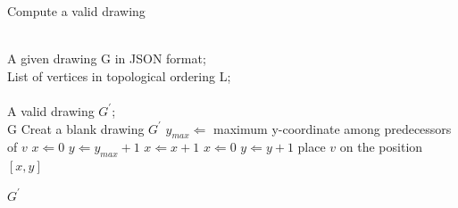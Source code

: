 \documentclass[utf8, a4paper, 12pt]{article}
\begin{document}
\begin{algorithm}
\caption{Compute a valid drawing} 
\begin{algorithmic}
\REQUIRE ~~\\ 
A given drawing G in JSON format;\\
List of vertices in topological ordering L;\\
\ENSURE ~~\\ 
A valid drawing $G^\prime$;\\
\RETURN G
\ENDIF
\STATE Creat a blank drawing $G^\prime$
\STATE $y_{max}\Leftarrow$ maximum y-coordinate among predecessors of $v$
\STATE $x\Leftarrow 0$
\STATE $y\Leftarrow y_{max}+1$
\STATE$x\Leftarrow x+1$
\ELSE
\STATE $x\Leftarrow 0$
\STATE $y\Leftarrow y+1$
\ENDIF
\STATE place $v$ on the position $[x,y]$
\ENDWHILE
\ENDFOR

\RETURN $G^{\prime}$
\end{algorithmic}
\label{initial}
\end{algorithm}
\end{document}
